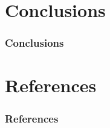 \documentclass{beamer}
\begin{document}
\section[Conclusions]{Conclusions}

\begin{frame}
\frametitle{Conclusions}
\end{frame}

\section*{References}

\begin{frame} 
	\frametitle{References} 
	
	\begin{thebibliography}{lskdjf}
  	\end{thebibliography}
\end{frame} 
\end{document}
